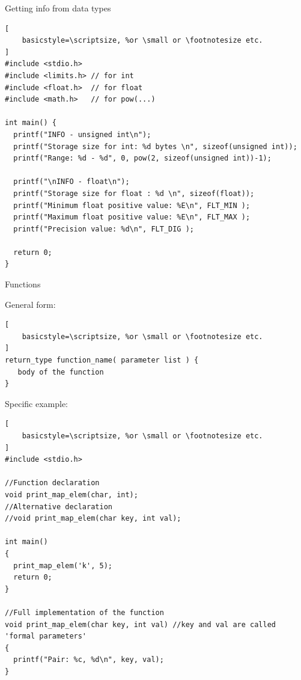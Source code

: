 \documentclass[10pt]{beamer}
\begin{document}
\begin{frame}[fragile]{Getting info from data types}
\begin{lstlisting}[
    basicstyle=\scriptsize, %or \small or \footnotesize etc.
]
#include <stdio.h>
#include <limits.h> // for int
#include <float.h>  // for float
#include <math.h>   // for pow(...)

int main() {
  printf("INFO - unsigned int\n");
  printf("Storage size for int: %d bytes \n", sizeof(unsigned int));
  printf("Range: %d - %d", 0, pow(2, sizeof(unsigned int))-1);

  printf("\nINFO - float\n");
  printf("Storage size for float : %d \n", sizeof(float));
  printf("Minimum float positive value: %E\n", FLT_MIN );
  printf("Maximum float positive value: %E\n", FLT_MAX );
  printf("Precision value: %d\n", FLT_DIG );

  return 0;
}
\end{lstlisting}
\end{frame}






\begin{frame}[fragile]{Functions}

General form:

\begin{lstlisting}[
    basicstyle=\scriptsize, %or \small or \footnotesize etc.
]
return_type function_name( parameter list ) {
   body of the function
}
\end{lstlisting}

Specific example:

\begin{lstlisting}[
    basicstyle=\scriptsize, %or \small or \footnotesize etc.
]
#include <stdio.h>

//Function declaration
void print_map_elem(char, int);
//Alternative declaration
//void print_map_elem(char key, int val);

int main()
{
  print_map_elem('k', 5);
  return 0;
}

//Full implementation of the function
void print_map_elem(char key, int val) //key and val are called 'formal parameters'
{
  printf("Pair: %c, %d\n", key, val);
}
\end{lstlisting}
\end{frame}
\end{document}

